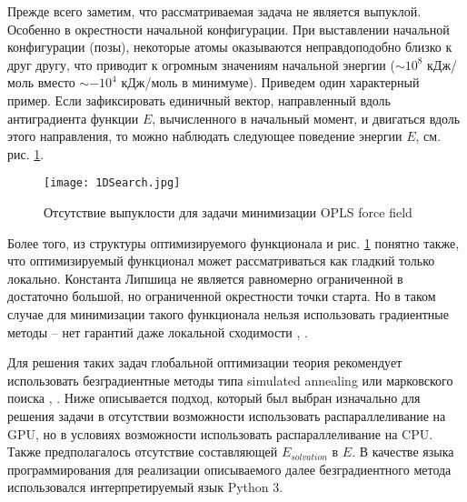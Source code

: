  Прежде всего заметим, что рассматриваемая задача не является выпуклой. Особенно в окрестности начальной конфигурации. При выставлении начальной конфигурации (позы), некоторые атомы оказываются неправдоподобно близко к друг другу, что приводит к огромным значениям начальной энергии ($\sim 10^{8}$ кДж/моль вместо $\sim -10^4$ кДж/моль в минимуме). Приведем один характерный пример. Если зафиксировать единичный вектор, направленный вдоль антиградиента функции $E$, вычисленного в начальный момент, и двигаться вдоль этого направления, то можно наблюдать следующее поведение энергии $E$, см. рис. \ref{fig1D}.

  \begin{figure}
  \begin{center}
  \texttt{[image: 1DSearch.jpg]}
  \end{center}
   \caption{Отсутствие выпуклости для задачи минимизации OPLS force field}
    \label{fig1D}
   \end{figure}
   
  Более того, из структуры оптимизируемого функционала и рис. \ref{fig1D} понятно также, что оптимизируемый функционал может рассматриваться как гладкий только локально. Константа Липшица не является равномерно ограниченной в достаточно большой, но ограниченной окрестности точки старта. Но в таком случае для минимизации такого функционала нельзя использовать градиентные методы -- нет гарантий даже локальной сходимости \cite{ghadimi2015generalized}, \cite{nesterov2017random}. 
   
  Для решения таких задач глобальной оптимизации теория рекомендует использовать безградиентные методы типа simulated annealing или марковского поиска \cite{zhigljavsky2007stochastic}, \cite{zhigljavsky2012theory}. Ниже описывается подход, который был выбран изначально для решения задачи в отсутствии возможности использовать распараллеливание на GPU, но в условиях возможности использовать распараллеливание на CPU. Также предполагалось отсутствие составляющей  $E_{solvation}$ в $E$. В качестве языка программирования для реализации описываемого далее безградиентного метода использовался интерпретируемый язык Python 3.
   
